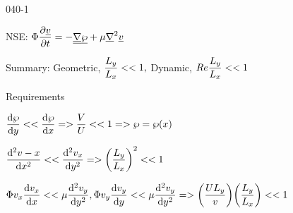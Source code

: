 \begin{mitframe}{040-1}

        
\begin{listone}

\item NSE: $\diss\dfrac{\partial\uline{\vvel}}{\partial{t}}=-\uline{\gradop}\uline{\dynpress}+\chempot\gradop^2\uline{\vvel}$

			\begin{listtwo}
            
            \item Summary: Geometric, $\dfrac{\length_y}{\length_{\disp}}<<1, $ Dynamic, $\reynolds\dfrac{\length_y}{\length_{\disp}}<< 1$
            
            \item Requirements
            
            				\begin{listthree}
                            
                            \item $\dfrac{\mathrm{d}\dynpress}{\mathrm{d}y}<<\dfrac{\mathrm{d}\dynpress}{\mathrm{d}\disp}=>\dfrac{\vol}{\uvel}<<1=>\dynpress=\dynpress(\disp)$
                            
                            \item $\dfrac{\mathrm{d}^2\vvel-{\disp}}{\mathrm{d}\disp^2}<<\dfrac{\mathrm{d}^2\vvel_{\disp}}{\mathrm{d}y^2}=>\bigg(\dfrac{\length_y}{\length_{\disp}}\bigg)^2<<1$
                            
                            \item$\diss\vvel_{\disp}\dfrac{\mathrm{d}\vvel_{\disp}}{\mathrm{d}\disp}<<\chempot\dfrac{\mathrm{d}^2\vvel_{y}}{\mathrm{d}y^2},\diss\vvel_{y}\dfrac{\mathrm{d}\vvel_{y}}{\mathrm{d}y}<<\chempot\dfrac{\mathrm{d}^2\vvel_{y}}{\mathrm{d}y^2}=>\bigg(\dfrac{\uvel\length_{y}}{\vvel}\bigg)\bigg(\dfrac{\length_{y}}{\length_{\disp}}\bigg)<<1$
                                                                        
\end{listthree}

\end{listtwo}

\end{listone}     
\end{mitframe}